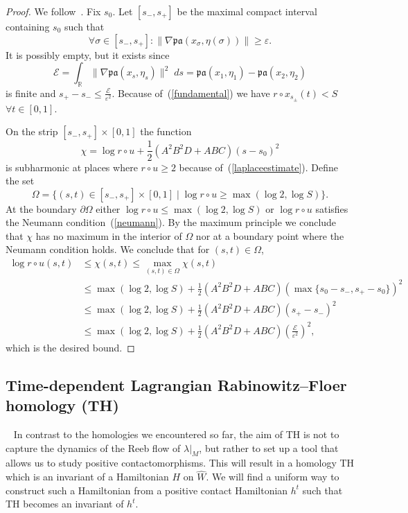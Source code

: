 \documentclass{amsart}
\newcommand{\Ecal}{{\mathcal{E}}}
\newcommand{\Scal}{{\mathcal{S}}}
\newcommand{\pacal}{\mathfrak{pa}}
\newcommand{\RR}{\mathbb{R}}
\newcommand{\haat}{\widehat}
\theoremstyle{definition}
\theoremstyle{remark}
\numberwithin{equation}{section}
\begin{document}
\begin{proof}
		
	We follow~\cite[Proposition 4.3]{CFO10}. Fix $s_0$. Let $[s_-,s_+]$ be the maximal compact interval containing $s_0$ such that 
	$$\forall\sigma\in[s_-,s_+]: \|\nabla\pacal(x_\sigma,\eta(\sigma))\|\geq\varepsilon.$$
	It is possibly empty, but it exists since 
	$$\Ecal=\int_\RR\|\nabla\pacal(x_s,\eta_s)\|^2\;ds=\pacal(x_1,\eta_1)-\pacal(x_2,\eta_2)$$
	is finite and $s_+-s_-\leq\frac\Ecal{\varepsilon^2}$. Because of~(\ref{fundamental}) we have $r\circ x_{s_\pm}(t)<S$ $\forall t\in[0,1]$.
	
	On the strip $[s_-,s_+]\times[0,1]$ the function 
	$$\chi=\log r\circ u + \frac12(A^2B^2D+ABC)(s-s_0)^2$$
	is subharmonic at places where $r\circ u\geq 2$ because of~(\ref{laplaceestimate}). Define the set
	$$\Omega=\{(s,t)\in[s_-,s_+]\times[0,1]\mid \log r\circ u\geq\max(\log 2,\log S)\}.$$ 
	At the boundary $\partial \Omega$ either $\log r\circ u\leq \max(\log 2,\log S)$ or $\log r\circ u$ satisfies the Neumann condition~(\ref{neumann}). By the maximum principle we conclude that $\chi$ has no maximum in the interior of $\Omega$ nor at a boundary point where the Neumann condition holds. We conclude that for $(s,t)\in\Omega$,
\begin{align*}
	\log r\circ u(s,t) &\leq\chi(s,t)\leq \max_{(s,t)\in\Omega} \chi(s,t)\\
	&\leq \max(\log 2,\log S) + \frac12(A^2B^2D+ABC)(\max\{s_0-s_-,s_+-s_0\})^2\\
	&\leq \max(\log 2,\log S) + \frac12(A^2B^2D+ABC)(s_+-s_-)^2\\
	&\leq \max(\log 2,\log S) + \frac12(A^2B^2D+ABC)\left(\frac\Ecal{\varepsilon^2}\right)^2,
\end{align*}
which is the desired bound.
\end{proof}


\subsection{Time-dependent Lagrangian Rabinowitz--Floer homology (TH)}~\label{sec:tlrfh}
In contrast to the homologies we encountered so far, the aim of TH is not to capture the dynamics of the Reeb flow of $\lambda|_M$, but rather to set up a tool that allows us to study positive contactomorphisms. This will result in a homology TH which is an invariant of a Hamiltonian $H$ on $\haat W$. We will find a uniform way to construct such a Hamiltonian from a positive contact Hamiltonian $h^t$ such that TH becomes an invariant of $h^t$. 
\end{document}

